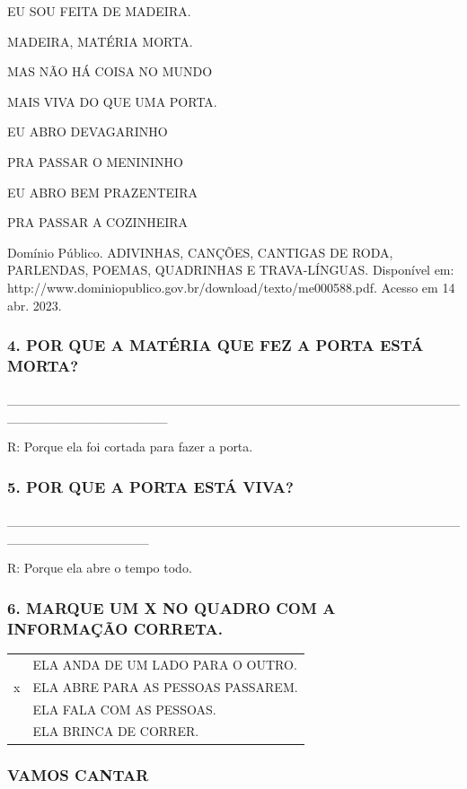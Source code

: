 EU SOU FEITA DE MADEIRA.

MADEIRA, MATÉRIA MORTA.

MAS NÃO HÁ COISA NO MUNDO

MAIS VIVA DO QUE UMA PORTA.

EU ABRO DEVAGARINHO

PRA PASSAR O MENININHO

EU ABRO BEM PRAZENTEIRA

PRA PASSAR A COZINHEIRA

Domínio Público. ADIVINHAS, CANÇÕES, CANTIGAS DE RODA, PARLENDAS, POEMAS, QUADRINHAS E TRAVA-LÍNGUAS. Disponível em: http://www.dominiopublico.gov.br/download/texto/me000588.pdf. Acesso em 14 abr. 2023.


\subsubsection{4. POR QUE A MATÉRIA QUE FEZ A PORTA ESTÁ
MORTA?}\label{por-que-a-maneira-que-fez-a-morta-estuxe1-morta}

\_\_\_\_\_\_\_\_\_\_\_\_\_\_\_\_\_\_\_\_\_\_\_\_\_\_\_\_\_\_\_\_\_\_\_\_\_\_\_\_\_\_\_\_\_\_\_\_\_\_\_\_\_\_\_\_\_\_\_\_\_\_\_\_\_

R: Porque ela foi cortada para fazer a porta.

\subsubsection{5. POR QUE A PORTA ESTÁ
VIVA?}\label{por-que-a-porta-estuxe1-viva}

\_\_\_\_\_\_\_\_\_\_\_\_\_\_\_\_\_\_\_\_\_\_\_\_\_\_\_\_\_\_\_\_\_\_\_\_\_\_\_\_\_\_\_\_\_\_\_\_\_\_\_\_\_\_\_\_\_\_\_\_\_\_\_

R: Porque ela abre o tempo todo.

\subsubsection{6. MARQUE UM X NO QUADRO COM A INFORMAÇÃO
CORRETA.}\label{marque-um-x-no-quadro-com-a-informauxe7uxe3o-correta.}

\begin{longtable}[]{@{}ll@{}}
\toprule
& ELA ANDA DE UM LADO PARA O OUTRO.\tabularnewline
x & ELA ABRE PARA AS PESSOAS PASSAREM.\tabularnewline
& ELA FALA COM AS PESSOAS.\tabularnewline
& ELA BRINCA DE CORRER.\tabularnewline
\bottomrule
\end{longtable}

\subsubsection{VAMOS CANTAR}\label{vamos-cantar-1}

